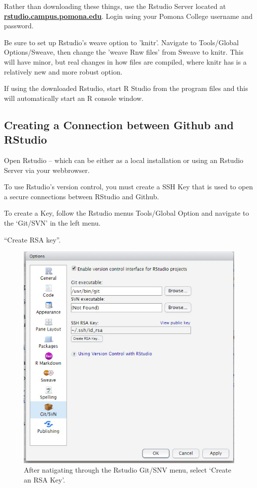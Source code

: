 \documentclass[12pt]{../SOP3_beta}
\begin{document}
\NP Rather than downloading these things, use the Rstudio Server located at \href{http://rstudio.campus.pomona.edu}{\textbf{rstudio.campus.pomona.edu}}. Login using your Pomona College username and password.

\NP Be sure to set up Rstudio's weave option to 'knitr'. Navigate to Tools/Global Options/Sweave, then change the 'weave Rnw files' from Sweave to knitr. This will have minor, but real changes in how files are compiled, where knitr has is a relatively new and more robust option.

\NP If using the downloaded Rstudio, start R Studio from the program files and this will automatically start an R console window.

\subsection{Creating a Connection between Github and RStudio}

\NP Open Rstudio -- which can be either as a local installation or using an Rstudio Server via your webbrowser.

\NP To use Rstudio's version control, you must create a SSH Key that is used to open a secure connections between RStudio and Github.

\NP To create a Key, follow the Rstudio menus Tools/Global Option and navigate to the `Git/SVN' in the left menu.

\NP ``Create RSA key''. 

\begin{figure}
\includegraphics{graphics/CreatingSSH.jpg}
\caption{After natigating through the Rstudio Git/SNV menu, select `Create an RSA Key'.}
\end{figure}
\end{document}
